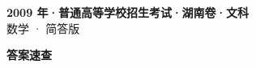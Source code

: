 \documentclass[zihao=-4, a4paper]{ctexart}
\begin{document}
\begin{center}
  {\Large\bfseries 2009 年·普通高等学校招生考试·湖南卷·文科}\\[4pt]
  {\large 数学 · 简答版}
\end{center}
\medskip
{}

\clearpage
{}
\begin{center}{\Large\bfseries 答案速查}\end{center}
\medskip

\end{document}
